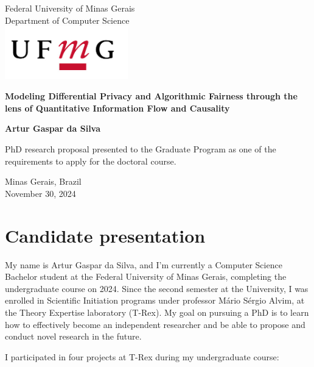 \documentclass[12pt]{article}
\begin{document}
\begin{titlepage}
   \begin{center}

       Federal University of Minas Gerais\\
       Department of Computer Science\\
       \vspace{1.0cm}
       \includegraphics[width=0.4\textwidth]{university}

       \vfill
       \textbf{Modeling Differential Privacy and Algorithmic Fairness through the lens of Quantitative Information Flow and Causality}
            
       \vspace{3.5cm}

       \textbf{Artur Gaspar da Silva}

       \vfill
            
       PhD research proposal presented to the Graduate Program as one of the requirements to apply for the doctoral course.
            
       \vspace{0.8cm}
     
            
       Minas Gerais, Brazil\\
       November 30, 2024
            
   \end{center}
\end{titlepage}

\section{Candidate presentation}

My name is Artur Gaspar da Silva, and I'm currently a Computer Science Bachelor student at the Federal University of Minas Gerais, completing the undergraduate course on 2024. Since the second semester at the University, I was enrolled in Scientific Initiation programs under professor Mário Sérgio Alvim, at the Theory Expertise laboratory (T-Rex). My goal on pursuing a PhD is to learn how to effectively become an independent researcher and be able to propose and conduct novel research in the future.

I participated in four projects at T-Rex during my undergraduate course:
\end{document}
